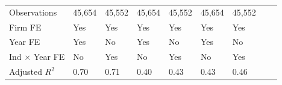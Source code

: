 \begin{table}[htbp]
\begin{tabularx}{\textwidth}{lYYYYYYYY@{}}
\hline
Observations    &   45,654         &   45,552         &   45,654         &   45,552         &   45,654         &   45,552         \\
Firm FE         &      Yes         &      Yes         &      Yes         &      Yes         &      Yes         &      Yes         \\
Year FE         &      Yes         &       No         &      Yes         &       No         &      Yes         &       No         \\
Ind $\times$ Year FE&       No         &      Yes         &       No         &      Yes         &       No         &      Yes         \\
Adjusted $ R^2$ &     0.70         &     0.71         &     0.40         &     0.43         &     0.43         &     0.46         \\
\bottomrule
\end{tabularx}
\end{table}

